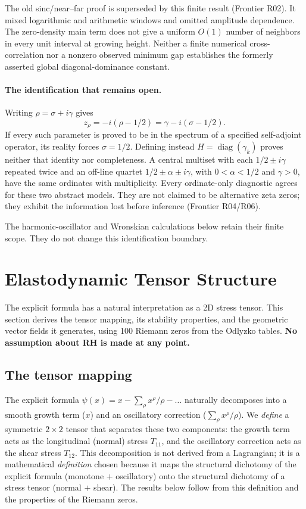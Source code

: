 \documentclass[11pt,a4paper]{article}
\theoremstyle{plain}
\theoremstyle{definition}
\theoremstyle{remark}
\begin{document}
The old sinc/near--far proof is superseded by this finite result (Frontier
R02). It mixed logarithmic and arithmetic windows and omitted amplitude
dependence. The zero-density main term does not give a uniform $O(1)$
number of neighbors in every unit interval at growing height. Neither a
finite numerical cross-correlation nor a nonzero observed minimum gap
establishes the formerly asserted global diagonal-dominance constant.

\paragraph{The identification that remains open.}
Writing $\rho=\sigma+i\gamma$ gives
\[
 z_\rho=-i(\rho-1/2)=\gamma-i(\sigma-1/2).
\]
If every such parameter is proved to be in the spectrum of a specified
self-adjoint operator, its reality forces $\sigma=1/2$. Defining instead
$H=\operatorname{diag}(\gamma_k)$ proves neither that identity nor
completeness. A central multiset with each $1/2\pm i\gamma$ repeated twice
and an off-line quartet $1/2\pm\alpha\pm i\gamma$, with
$0<\alpha<1/2$ and $\gamma>0$, have the same ordinates
with multiplicity. Every ordinate-only diagnostic agrees for these two
abstract models. They are not claimed to be alternative zeta zeros; they
exhibit the information lost before inference (Frontier R04/R06).

The harmonic-oscillator and Wronskian calculations below retain their
finite scope. They do not change this identification boundary.

\section{Elastodynamic Tensor Structure}
\label{sec:tensor}

The explicit formula has a natural interpretation as a 2D stress tensor.
This section derives the tensor mapping, its stability properties, and
the geometric vector fields it generates, using 100 Riemann zeros from
the Odlyzko tables.  \textbf{No assumption about RH is made at any point.}

\subsection{The tensor mapping}

The explicit formula $\psi(x) = x - \sum_\rho x^\rho/\rho - \ldots$
naturally decomposes into a smooth growth term ($x$) and an oscillatory
correction ($\sum_\rho x^\rho/\rho$).  We \emph{define} a symmetric
$2 \times 2$ tensor that separates these two components:
the growth term acts as the longitudinal (normal) stress $T_{11}$, and the
oscillatory correction acts as the shear stress $T_{12}$.
This decomposition is not derived from a Lagrangian; it is a mathematical
\emph{definition} chosen because it maps the structural dichotomy of the
explicit formula (monotone $+$ oscillatory) onto the structural dichotomy
of a stress tensor (normal $+$ shear).  The results below follow from
this definition and the properties of the Riemann zeros.
\end{document}
